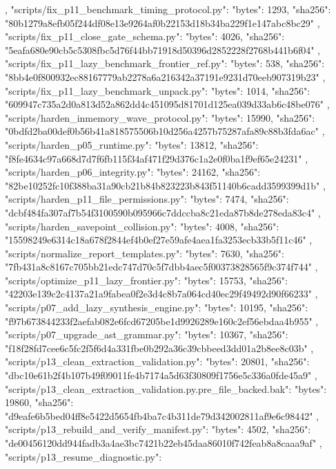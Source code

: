 {{{    },
    "scripts/fix_p11_benchmark_timing_protocol.py": {
      "bytes": 1293,
      "sha256": "80b1279a8efb05f244df08e13e9264af0b22153d18b34ba229f1e147abc8bc29"
    },
    "scripts/fix_p11_close_gate_schema.py": {
      "bytes": 4026,
      "sha256": "5eafa680e90cb5c5308fbc5d76f44bb71918d50396d2852228f2768b441b6f04"
    },
    "scripts/fix_p11_lazy_benchmark_frontier_ref.py": {
      "bytes": 538,
      "sha256": "8bb4e0f800932ec88167779ab2278a6a216342a37191e9231d70eeb907319b23"
    },
    "scripts/fix_p11_lazy_benchmark_unpack.py": {
      "bytes": 1014,
      "sha256": "609947c735a2d0a813d52a862dd4c451095d81701d125ea039d33ab6c48be076"
    },
    "scripts/harden_inmemory_wave_protocol.py": {
      "bytes": 15990,
      "sha256": "0bdfd2ba00def0b56b41a818575506b10d256a4257b75287afa89c88b3fda6ac"
    },
    "scripts/harden_p05_runtime.py": {
      "bytes": 13812,
      "sha256": "f8fe4634c97a668d7d7f6fb115f34af471f29d376c1a2e0f0ba1f9ef65e24231"
    },
    "scripts/harden_p06_integrity.py": {
      "bytes": 24162,
      "sha256": "82be10252fc10f388ba31a90cb21b84b823223b843f51140b6cadd3599399d1b"
    },
    "scripts/harden_p11_file_permissions.py": {
      "bytes": 7474,
      "sha256": "dcbf484fa307af7b54f3100590b095966c7ddccba8c21eda87b8de278eda83c4"
    },
    "scripts/harden_savepoint_collision.py": {
      "bytes": 4008,
      "sha256": "15598249e6314c18a678f2844ef4b0ef27e59afe4aea1fa3253ecb33b5f11c46"
    },
    "scripts/normalize_report_templates.py": {
      "bytes": 7630,
      "sha256": "7fb431a8c8167c705bb21edc747d70c5f7dbb4aec5f00373828565f9c374f744"
    },
    "scripts/optimize_p11_lazy_frontier.py": {
      "bytes": 15753,
      "sha256": "42203e139c2c4137a21a9fabea0f2e3d4c8b7a064cd40ec29f49492d90f66233"
    },
    "scripts/p07_add_lazy_synthesis_engine.py": {
      "bytes": 10195,
      "sha256": "f97b673844233f2aefab082e6fcd67205be1d9926289e160c2ef56ebdaa4b955"
    },
    "scripts/p07_upgrade_ast_grammar.py": {
      "bytes": 10367,
      "sha256": "f18f28fd7cee6c5fc2f5f6d4a331fbe0b292a36c39cbbeed3dd01a2b8ee8c03b"
    },
    "scripts/p13_clean_extraction_validation.py": {
      "bytes": 20801,
      "sha256": "dbc10e61b2f4b107b49f09011fe4b7174a5d63f30809f1756e5c336a0fde45a9"
    },
    "scripts/p13_clean_extraction_validation.py.pre_file_backed.bak": {
      "bytes": 19860,
      "sha256": "d9eafe6b5bed04ff8e5422d5654fb4ba7c4b311de79d342002811af9e6c98442"
    },
    "scripts/p13_rebuild_and_verify_manifest.py": {
      "bytes": 4502,
      "sha256": "de00456120dd944fadb3a4ae3bc7421b22eb45daa86010f742feab8a8caaa9af"
    },
    "scripts/p13_resume_diagnostic.py": {
}}}
